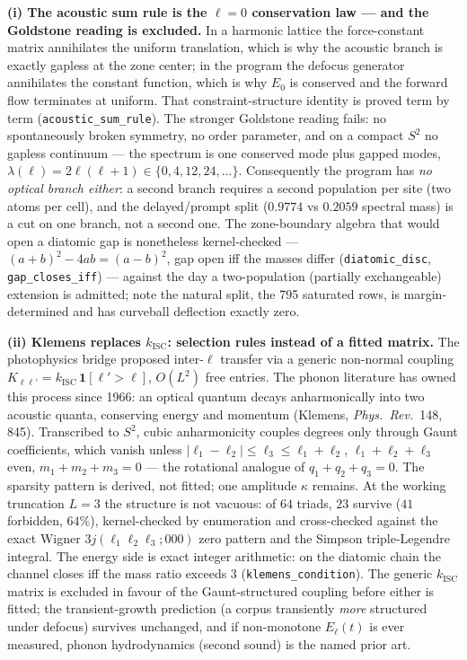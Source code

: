 \documentclass[11pt,a4paper]{article}
\theoremstyle{plain}
\theoremstyle{remark}
\begin{document}
\textbf{(i) The acoustic sum rule is the $\ell=0$ conservation law --- and the Goldstone reading is excluded.} In a harmonic lattice the force-constant matrix annihilates the uniform translation, which is why the acoustic branch is exactly gapless at the zone center; in the program the defocus generator annihilates the constant function, which is why $E_0$ is conserved and the forward flow terminates at uniform. That constraint-structure identity is proved term by term (\texttt{acoustic\_sum\_rule}). The stronger Goldstone reading fails: no spontaneously broken symmetry, no order parameter, and on a compact $S^2$ no gapless continuum --- the spectrum is one conserved mode plus gapped modes, $\lambda(\ell) = 2\ell(\ell+1) \in \{0, 4, 12, 24, \dots\}$. Consequently the program has \emph{no optical branch either}: a second branch requires a second population per site (two atoms per cell), and the delayed/prompt split ($0.9774$ vs $0.2059$ spectral mass) is a cut on one branch, not a second one. The zone-boundary algebra that would open a diatomic gap is nonetheless kernel-checked --- $(a{+}b)^2 - 4ab = (a{-}b)^2$, gap open iff the masses differ (\texttt{diatomic\_disc}, \texttt{gap\_closes\_iff}) --- against the day a two-population (partially exchangeable) extension is admitted; note the natural split, the 795 saturated rows, is margin-determined and has curveball deflection exactly zero.

\textbf{(ii) Klemens replaces $k_{\mathrm{ISC}}$: selection rules instead of a fitted matrix.} The photophysics bridge proposed inter-$\ell$ transfer via a generic non-normal coupling $K_{\ell\ell'} = k_{\mathrm{ISC}}\,\mathbf{1}[\ell' > \ell]$, $O(L^2)$ free entries. The phonon literature has owned this process since 1966: an optical quantum decays anharmonically into two acoustic quanta, conserving energy and momentum (Klemens, \emph{Phys.\ Rev.}\ 148, 845). Transcribed to $S^2$, cubic anharmonicity couples degrees only through Gaunt coefficients, which vanish unless $|\ell_1-\ell_2| \le \ell_3 \le \ell_1+\ell_2$, $\ell_1+\ell_2+\ell_3$ even, $m_1+m_2+m_3 = 0$ --- the rotational analogue of $q_1+q_2+q_3=0$. The sparsity pattern is derived, not fitted; one amplitude $\kappa$ remains. At the working truncation $L=3$ the structure is not vacuous: of $64$ triads, $23$ survive ($41$ forbidden, $64\%$), kernel-checked by enumeration and cross-checked against the exact Wigner $3j(\ell_1\ell_2\ell_3;000)$ zero pattern and the Simpson triple-Legendre integral. The energy side is exact integer arithmetic: on the diatomic chain the channel closes iff the mass ratio exceeds $3$ (\texttt{klemens\_condition}). The generic $k_{\mathrm{ISC}}$ matrix is excluded in favour of the Gaunt-structured coupling before either is fitted; the transient-growth prediction (a corpus transiently \emph{more} structured under defocus) survives unchanged, and if non-monotone $E_\ell(t)$ is ever measured, phonon hydrodynamics (second sound) is the named prior art.
\end{document}

